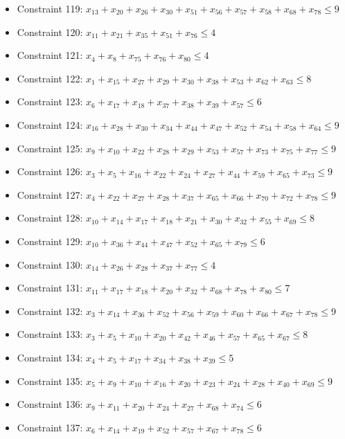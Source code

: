\documentclass[11pt]{article}
\begin{document}
\begin{itemize}
\item Constraint 119: $x_{13} + x_{20} + x_{26} + x_{30} + x_{51} + x_{56} + x_{57} + x_{58} + x_{68} + x_{78} \le 9$
\item Constraint 120: $x_{11} + x_{21} + x_{35} + x_{51} + x_{76} \le 4$
\item Constraint 121: $x_{4} + x_{8} + x_{75} + x_{76} + x_{80} \le 4$
\item Constraint 122: $x_{1} + x_{15} + x_{27} + x_{29} + x_{30} + x_{38} + x_{53} + x_{62} + x_{63} \le 8$
\item Constraint 123: $x_{6} + x_{17} + x_{18} + x_{37} + x_{38} + x_{39} + x_{57} \le 6$
\item Constraint 124: $x_{16} + x_{28} + x_{30} + x_{34} + x_{44} + x_{47} + x_{52} + x_{54} + x_{58} + x_{64} \le 9$
\item Constraint 125: $x_{9} + x_{10} + x_{22} + x_{28} + x_{29} + x_{53} + x_{57} + x_{73} + x_{75} + x_{77} \le 9$
\item Constraint 126: $x_{3} + x_{5} + x_{16} + x_{22} + x_{24} + x_{27} + x_{44} + x_{59} + x_{65} + x_{73} \le 9$
\item Constraint 127: $x_{4} + x_{22} + x_{27} + x_{28} + x_{37} + x_{65} + x_{66} + x_{70} + x_{72} + x_{78} \le 9$
\item Constraint 128: $x_{10} + x_{14} + x_{17} + x_{18} + x_{21} + x_{30} + x_{32} + x_{55} + x_{69} \le 8$
\item Constraint 129: $x_{10} + x_{36} + x_{44} + x_{47} + x_{52} + x_{65} + x_{79} \le 6$
\item Constraint 130: $x_{14} + x_{26} + x_{28} + x_{37} + x_{77} \le 4$
\item Constraint 131: $x_{11} + x_{17} + x_{18} + x_{20} + x_{32} + x_{68} + x_{78} + x_{80} \le 7$
\item Constraint 132: $x_{3} + x_{14} + x_{36} + x_{52} + x_{56} + x_{59} + x_{60} + x_{66} + x_{67} + x_{78} \le 9$
\item Constraint 133: $x_{3} + x_{5} + x_{10} + x_{20} + x_{42} + x_{46} + x_{57} + x_{65} + x_{67} \le 8$
\item Constraint 134: $x_{4} + x_{5} + x_{17} + x_{34} + x_{38} + x_{39} \le 5$
\item Constraint 135: $x_{5} + x_{9} + x_{10} + x_{16} + x_{20} + x_{23} + x_{24} + x_{28} + x_{40} + x_{69} \le 9$
\item Constraint 136: $x_{9} + x_{11} + x_{20} + x_{24} + x_{27} + x_{68} + x_{74} \le 6$
\item Constraint 137: $x_{6} + x_{14} + x_{19} + x_{52} + x_{57} + x_{67} + x_{78} \le 6$

\end{itemize}
\end{document}
